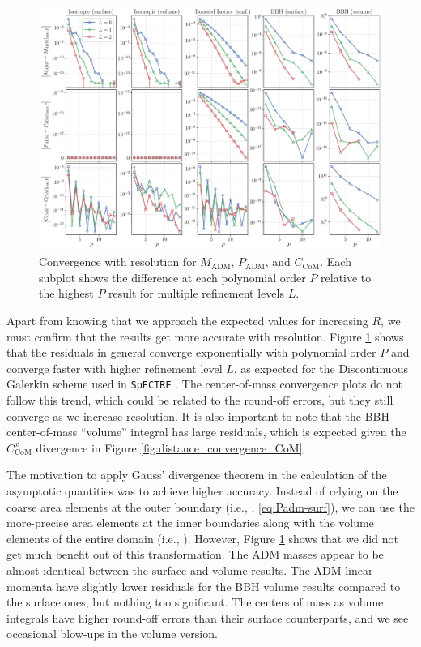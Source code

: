 \documentclass{../document}
\begin{document}
      \begin{figure}
        \centering
        \includegraphics[width=\textwidth]{../../plots/final_report/resolution_convergence.pdf}
        \caption{Convergence with resolution for $M_\text{ADM}$, $P_\text{ADM}$, and $C_\text{CoM}$. Each subplot shows the difference at each polynomial order $P$ relative to the highest $P$ result for multiple refinement levels $L$.}
        \label{fig:resolution_convergence}
      \end{figure}

      Apart from knowing that we approach the expected values for increasing $R$, we must confirm that the results get more accurate with resolution. Figure \ref{fig:resolution_convergence} shows that the residuals in general converge exponentially with polynomial order $P$ and converge faster with higher refinement level $L$, as expected for the Discontinuous Galerkin scheme used in {\tt SpECTRE} \cite{DGMethods}. The center-of-mass convergence plots do not follow this trend, which could be related to the round-off errors, but they still converge as we increase resolution. It is also important to note that the BBH center-of-mass ``volume'' integral has large residuals, which is expected given the $C_\text{CoM}^x$ divergence in Figure \ref{fig:distance_convergence_CoM}.

      The motivation to apply Gauss' divergence theorem in the calculation of the asymptotic quantities was to achieve higher accuracy. Instead of relying on the coarse area elements at the outer boundary (i.e., \eqs{\eqref{eq:Madm-surf}, \eqref{eq:CoM-surf}}, \eqref{eq:Padm-surf}), we can use the more-precise area elements at the inner boundaries along with the volume elements of the entire domain (i.e., \eqs{\eqref{eq:Madm-mixed}--\eqref{eq:Padm-mixed}}). However, Figure \ref{fig:resolution_convergence} shows that we did not get much benefit out of this transformation. The ADM masses appear to be almost identical between the surface and volume results. The ADM linear momenta have slightly lower residuals for the BBH volume results compared to the surface ones, but nothing too significant. The centers of mass as volume integrals have higher round-off errors than their surface counterparts, and we see occasional blow-ups in the volume version.
\end{document}

